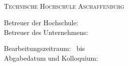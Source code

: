 \newcommand{\univname}{Technische Hochschule Aschaffenburg}



\newlength\headpicwd
\setlength{\headpicwd}{0.2\pdfpagewidth} %
\newcommand\printlogo{%
}

\begin{titlepage}
\begin{center}


\printlogo


\vspace*{.06\textheight}
{\scshape\LARGE \textbf{\papertitle}\par}\vspace{0.5cm} %
\textsc{\Large \textbf{\papersubtitle}}\\[0.5cm] %


\vspace{1cm}


\authorname \\
\enrolmentnumber \\
\mailadress




 
\vspace{1cm}






\papertype \\
\paperscope

 
\vspace{1cm}


{\scshape\large \univname\par} %

{\scshape\large \programmename \par} %


\vspace{1cm}

Betreuer der Hochschule: \supervisorname \\
Betreuer des Unternehmens: \firstassessorname \\


\vspace{1cm}

Bearbeitungszeitraum: \startdate\ bis \finishdate \\

Abgabedatum und Kolloquium: \submissiondate

 
\vfill
\end{center}
\end{titlepage}


\thispagestyle{empty}
\quad \addtocounter{page}{-1}
{}   